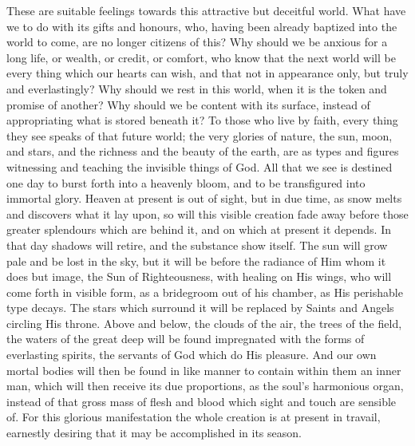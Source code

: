These are suitable feelings towards this attractive but deceitful
world. What have we to do with its gifts and honours, who, having been
already baptized into the world to come, are no longer citizens of
this? Why should we be anxious for a long life, or wealth, or credit,
or comfort, who know that the next world will be every thing which our
hearts can wish, and that not in appearance only, but truly and
everlastingly? Why should we rest in this world, when it is the token
and promise of another? Why should we be content with its surface,
instead of appropriating what is stored beneath it? To those who live
by faith, every thing they see speaks of that future world; the very
glories of nature, the sun, moon, and stars, and the richness and the
beauty of the earth, are as types and figures witnessing and teaching
the invisible things of God. All that we see is destined one day to
burst forth into a heavenly bloom, and to be transfigured into
immortal glory. Heaven at present is out of sight, but in due time, as
snow melts and discovers what it lay upon, so will this visible
creation fade away before those greater splendours which are behind
it, and on which at present it depends. In that day shadows will
retire, and the substance show itself. The sun will grow pale and be
lost in the sky, but it will be before the radiance of Him whom it
does but image, the Sun of Righteousness, with healing on His wings,
who will come forth in visible form, as a bridegroom out of his
chamber, as His perishable type decays. The stars which surround it
will be replaced by Saints and Angels circling His throne. Above and
below, the clouds of the air, the trees of the field, the waters of
the great deep will be found impregnated with the forms of everlasting
spirits, the servants of God which do His pleasure. And our own mortal
bodies will then be found in like manner to contain within them an
inner man, which will then receive its due proportions, as the soul's
harmonious organ, instead of that gross mass of flesh and blood which
sight and touch are sensible of. For this glorious manifestation the
whole creation is at present in travail, earnestly desiring that it
may be accomplished in its season.

